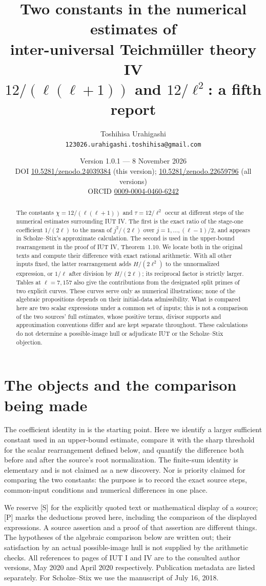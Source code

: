 \documentclass[11pt]{article}
\title{Two constants in the numerical estimates of\\
 inter-universal Teichm\"uller theory IV\\[4pt]
 \large $12/(\ell(\ell+1))$ and $12/\ell^2$: a fifth report}
\author{Toshihisa Urahigashi\\
 \small\texttt{123026.urahigashi.toshihisa@gmail.com}}
\date{Version 1.0.1 --- 8 November 2026\\[3pt]
 \small DOI \href{https://doi.org/10.5281/zenodo.24039384}{10.5281/zenodo.24039384} (this version);
 \href{https://doi.org/10.5281/zenodo.22659796}{10.5281/zenodo.22659796} (all versions)\\[3pt]
 \small ORCID \href{https://orcid.org/0009-0004-0460-6242}{0009-0004-0460-6242}}
\theoremstyle{remark}
\newcommand{\Smark}{\textup{[S]}}
\newcommand{\Pmark}{\textup{[P]}}
\begin{document}
\maketitle
\begin{abstract}
The constants $\chi=12/(\ell(\ell+1))$ and $\tau=12/\ell^2$
occur at different steps of the numerical estimates surrounding IUT IV.
The first is the exact ratio of the stage-one coefficient $1/(2\ell)$ to the
mean of $j^{2}/(2\ell)$ over $j=1,\dots,(\ell-1)/2$, and appears in
Scholze--Stix's approximate calculation.  The second is used in the upper-bound rearrangement in the
proof of IUT IV, Theorem~1.10.  We locate both in the original texts and
compute their difference with exact rational arithmetic.  With all other
inputs fixed, the latter rearrangement adds $H/(2\ell^2)$ to the unnormalized
expression, or $1/\ell$ after division by $H/(2\ell)$; its reciprocal factor
is strictly larger.  Tables at $\ell=7,157$ also give the contributions from
the designated split primes of two explicit curves.  These curves serve only
as numerical illustrations; none of the algebraic propositions depends on
their initial-data admissibility.  What is compared here are two scalar expressions under a common set of inputs;
this is not a comparison of the two sources' full estimates, whose positive
terms, divisor supports and approximation conventions differ and are kept
separate throughout.  These calculations do not determine a possible-image hull
or adjudicate IUT or the Scholze--Stix objection.
\end{abstract}

\section{The objects and the comparison being made}\label{s:scope}

The coefficient identity in \cite[\S7]{Fourth} is the starting point.
Here we identify a larger sufficient constant used in an upper-bound
estimate, compare it with the sharp threshold for the scalar rearrangement
defined below, and quantify
the difference both before and after the source's root normalization.
The finite-sum identity is elementary and is not claimed as a new discovery.
Nor is priority claimed for comparing the two constants: the purpose is
to record the exact source steps, common-input conditions and numerical
differences in one place.

We reserve \Smark{} for the explicitly quoted text or mathematical display
of a source; \Pmark{} marks the deductions proved here, including the
comparison of the displayed expressions.  A source assertion and a proof
of that assertion are different things.  The hypotheses of the algebraic
comparison below are written out; their satisfaction by an actual
possible-image hull is not supplied by the arithmetic checks.
All references to pages of IUT I and IV are to the consulted author
versions, May 2020 and April 2020 respectively.  Publication metadata are
listed separately.  For Scholze--Stix we use the manuscript of July 16, 2018.
\end{document}
